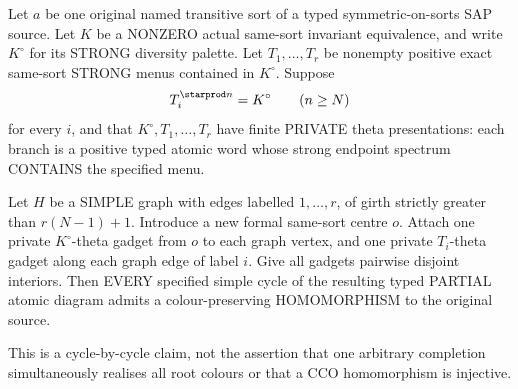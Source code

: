 \begin{lemma}
\label{lem:typed-relative-reset-cycle-guard}
Let \(a\) be one original named
transitive sort of a typed
symmetric-on-sorts SAP source.
Let \(K\) be a NONZERO actual
same-sort invariant equivalence,
and write \(K^\circ\) for its
STRONG diversity palette.
Let \(T_1,\ldots,T_r\) be
nonempty positive exact
same-sort STRONG menus
contained in \(K^\circ\).
Suppose
\[
 T_i^{\starprod n}=K^\circ
       \qquad(n\ge N)
\]
for every \(i\), and that
\(K^\circ,T_1,\ldots,T_r\)
have finite PRIVATE theta
presentations: each branch
is a positive typed atomic
word whose strong endpoint
spectrum CONTAINS the
specified menu.

Let \(H\) be a SIMPLE
graph with edges labelled
\(1,\ldots,r\), of girth
strictly greater than
\(r(N-1)+1\).
Introduce a new formal
same-sort centre \(o\).
Attach one private
\(K^\circ\)-theta gadget
from \(o\) to each graph
vertex, and one private
\(T_i\)-theta gadget along
each graph edge of label
\(i\). Give all gadgets
pairwise disjoint interiors.
Then EVERY specified
simple cycle of the
resulting typed PARTIAL
atomic diagram admits
a colour-preserving
HOMOMORPHISM to the
original source.

This is a cycle-by-cycle
claim, not the assertion
that one arbitrary
completion simultaneously
realises all root colours
or that a CCO homomorphism
is injective.
\end{lemma}
